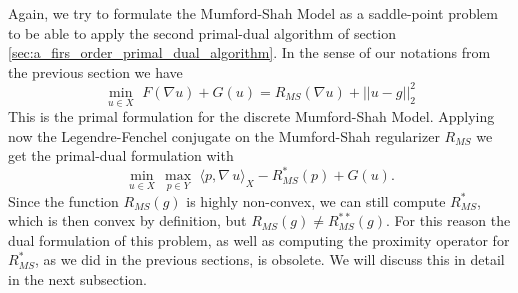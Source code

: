         Again, we try to formulate the Mumford-Shah Model as a saddle-point problem to be able to apply the second primal-dual algorithm of section \ref{sec:a_firs_order_primal_dual_algorithm}. In the sense of our notations from the previous section we have
            \begin{equation}
                \min_{u \in X}\,\, F(\nabla u) + G(u) = R_{MS}(\nabla u) + ||u - g||_{2}^{2}
                \label{eq:primal_mumford_shah_model}
            \end{equation}
        This is the primal formulation for the discrete Mumford-Shah Model. Applying now the Legendre-Fenchel conjugate on the Mumford-Shah regularizer $R_{MS}$ we get the primal-dual formulation with
            \begin{equation}
                \min_{u \in X}\, \max_{p \in Y}\,\, \langle p, \nabla \, u \rangle_{X} - R_{MS}^{\ast}(p) + G(u).%
            \label{eq:primal_dual_mumford_shah_model}
            \end{equation}
        Since the function $R_{MS}(g)$ is highly non-convex, we can still compute $R^{\ast}_{MS}$, which is then convex by definition, but $R_{MS}(g) \neq R^{\ast\ast}_{MS}(g)$. For this reason the dual formulation of this problem, as well as computing the proximity operator for $R^{\ast}_{MS}$, as we did in the previous sections, is obsolete. We will discuss this in detail in the next subsection.
